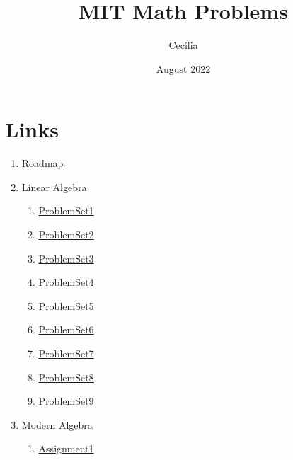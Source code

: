 \documentclass{article}
\title{MIT Math Problems}
\author{Cecilia}
\date{August 2022}
\newcommand{\emptymacro}{}    %
\newcommand{\linearalgebra}{}
\begin{document}
\maketitle

\section*{Links}
    \begin{enumerate}
        \item \href{https://math.mit.edu/academics/undergrad/roadmaps.php}{Roadmap}
        \ifx\linearalgebra\emptymacro
        \item \href{https://ocw.mit.edu/courses/18-700-linearalgebra-fall-2013/}{Linear Algebra}
        \begin{enumerate}
            \item \hyperlink{LinearAlgebra-ProblemSet1.1}{ProblemSet1}
            \item \hyperlink{LinearAlgebra-ProblemSet2.1}{ProblemSet2}
            \item \hyperlink{LinearAlgebra-ProblemSet3.1}{ProblemSet3}
            \item \hyperlink{LinearAlgebra-ProblemSet4.1}{ProblemSet4}
            \item \hyperlink{LinearAlgebra-ProblemSet5.1}{ProblemSet5}
            \item \hyperlink{LinearAlgebra-ProblemSet6.1}{ProblemSet6}
            \item \hyperlink{LinearAlgebra-ProblemSet7.1}{ProblemSet7}
            \item \hyperlink{LinearAlgebra-ProblemSet8.1}{ProblemSet8}
            \item \hyperlink{LinearAlgebra-ProblemSet9.1}{ProblemSet9}
        \end{enumerate}
        \fi
        \item \href{https://math.mit.edu/classes/18.703/index.html}{Modern Algebra}
        \begin{enumerate}
            \item \hyperlink{ModernAlgebra-Assignment01}{Assignment1}
        \end{enumerate}
    \end{enumerate}

\ifx\linearalgebra\emptymacro
%
%








\end{document}
